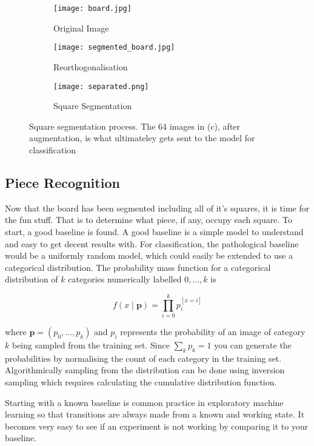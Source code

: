 \begin{figure}[h]
    \centering
    \begin{subfigure}[b]{0.32\textwidth}
        \centering
        \texttt{[image: board.jpg]}
        \caption{Original Image}
    \end{subfigure}
    \hfill
    \begin{subfigure}[b]{0.32\textwidth}
        \centering
        \texttt{[image: segmented\_board.jpg]}
        \caption{Reorthogonalisation}
    \end{subfigure}
    \hfill
    \begin{subfigure}[b]{0.32\textwidth}
        \centering
        \texttt{[image: separated.png]}
        \caption{Square Segmentation}
    \end{subfigure}
\caption{Square segmentation process.  The 64 images in (c), after augmentation, is what ultimateley gets sent to the model for classification}
\label{fig:corner}
\end{figure}
    

\subsection{Piece Recognition}
Now that the board has been segmented including all of it's squares, it is time for the fun stuff.  That is
to determine what piece, if any, occupy each square.  To start, a good baseline is found.  
A good baseline is a simple model to understand and easy to get decent results with.
For classification, the pathological baseline would be a uniformly random model, which could easily be extended to use a categorical distribution.
The probability mass function for a categorical distribution of $k$ categories numerically labelled $0, ..., k$ is

$$ f(x \;|\; \bm{p}) = \prod\limits_{i=0}^{k}{p_i^{[x=i]}} $$

where $\bm{p} = (p_0, ..., p_k)$ and $p_i$ represents the probability of an image of category $k$ being sampled from the training set.
Since $\sum_{k}{p_k} = 1$ you can generate the probabilities by normalising the count of each category in the training set.  Algorithmically 
sampling from the distribution can be done using inversion sampling which requires calculating the cumulative distribution function.

Starting with a known baseline is common practice in exploratory machine learning \cite{} so that transitions are always made from a known and working state.  
It becomes very easy to see if an experiment is not working by comparing it to your baseline.

